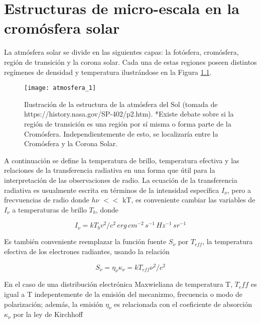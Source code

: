 \chapter{Estructuras de micro-escala en la crom\'osfera solar}

La atm\'osfera solar se divide en las siguientes capas: la fot\'osfera, crom\'osfera, regi\'on de transici\'on y la corona solar. Cada una de estas regiones poseen distintos reg\'imenes de densidad y temperatura ilustr\'andose en la Figura \ref{atmosfera_solar}.

\begin{figure}[h]
\centering
\texttt{[image: atmosfera\_1]}
\caption{Ilustraci\'on de la estructura de la atm\'osfera del Sol (tomada de https://history.nasa.gov/SP-402/p2.htm). \newline
*Existe debate sobre si la regi\'on de transici\'on es una regi\'on por s\'i misma o forma parte de la Crom\'osfera. Independientemente de esto, se localizar\'ia entre la Crom\'osfera y la Corona Solar.} \label{atmosfera_solar}
\end{figure}

A continuaci\'on se define la temperatura de brillo, temperatura efectiva y las relaciones de la transferencia radiativa en una forma que \'util para la interpretaci\'on de las observaciones de radio. La ecuaci\'on de la transferencia radiativa es usualmente escrita en t\'erminos de la intensidad espec\'ifica $I_\nu$, pero a frecvuencias de radio donde \textit{$h\nu$} $<<$ kT, es conveniente cambiar las variables de $I_\nu$ a temperaturas de brillo $T_b$, donde

\begin{equation} \label{temperatura_brillo}
I_\nu = kT_bv^2/c^2\, erg \, cm^{-2} \,s^{-1} \,Hz^{-1} \,sr^{-1}
\end{equation}

Es tambi\'en conveniente reemplazar la funci\'on fuente $S_\nu$ por $T_{eff}$, la temperatura efectiva de los electrones radiantes, usando la relaci\'on

\begin{equation} \label{fuente}
S_\nu = \eta_\nu \kappa_\nu = kT_{eff}\nu^2/c^2
\end{equation}

En el caso de una distribuci\'on electr\'onica Maxwieliana de temperatura T, $T_eff$ es igual a T indepentemente de la emisi\'on del mecanizmo, frecuencia o modo de polarizaci\'on; adem\'as, la emisi\'on $\eta_\nu$ es relacionada con el coeficiente de absorci\'on $\kappa_\nu$ por la ley de Kirchhoff


